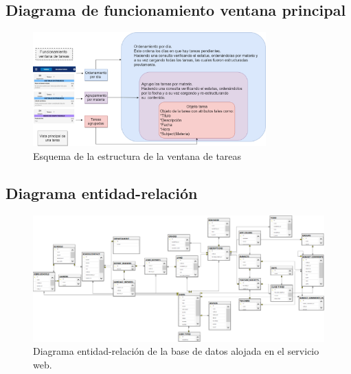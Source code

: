 \documentclass[10pt]{article}
\begin{document}
\subsection{Diagrama de funcionamiento ventana principal}
\begin{figure}[H]
    \begin{center}
        \includegraphics[width=0.8\textwidth]{Imagenes/DiagramaTareas.png}
        \caption{Esquema de la estructura de la ventana de tareas}
        \label{fig12}
    \end{center}
\end{figure}
\begin{landscape}
    \subsection{Diagrama entidad-relación}
    \begin{figure}[h]
        \centering
        \begin{center}
            \includegraphics[width=1.3\textwidth]{Imagenes/diagrama.png}
            \caption{Diagrama entidad-relación de la base de datos alojada en el servicio web.}
            \label{fig13}
        \end{center}
    \end{figure}
\end{landscape}
\newpage
\end{document}
